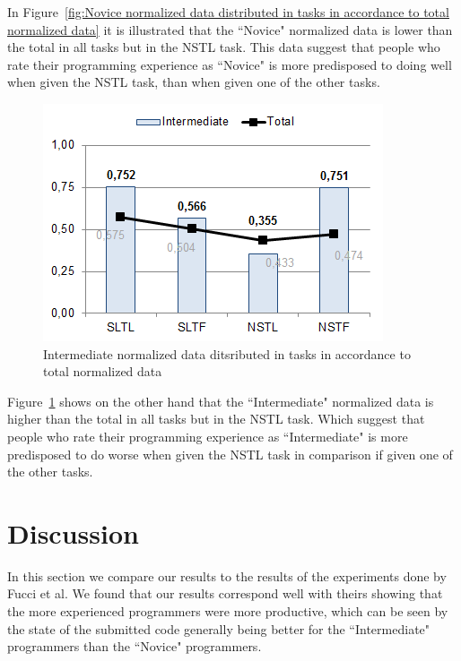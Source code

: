 \documentclass{sig-alternate-05-2015}
\begin{document}
In Figure~\ref{fig:Novice normalized data distributed in tasks in accordance to total normalized data} it is illustrated that the ``Novice" normalized data is lower than the total in all tasks but in the NSTL task. This data suggest that people who rate their programming experience as ``Novice" is more predisposed to doing well when given the NSTL task, than when given one of the other tasks.

\begin{figure}[!ht]
	\centering
	\includegraphics[width=1\linewidth]{img12}
	\caption{Intermediate normalized data ditsributed in tasks in accordance to total normalized data}
	\label{fig:Intermediate normalized data ditsributed in tasks in accordance to total normalized data}
\end{figure}

Figure~\ref{fig:Intermediate normalized data ditsributed in tasks in accordance to total normalized data} shows on the other hand that the ``Intermediate" normalized data is higher than the total in all tasks but in the NSTL task. Which suggest that people who rate their programming experience as ``Intermediate" is more predisposed to do worse when given the NSTL task in comparison if given one of the other tasks.


\section{Discussion}
\label{sec:Discussion}
In this section we compare our results to the results of the experiments done by Fucci et al. We found that our results correspond well with theirs showing that the more experienced programmers were more productive, which can be seen by the state of the submitted code generally being better for the ``Intermediate" programmers than the  ``Novice" programmers.
\end{document}
